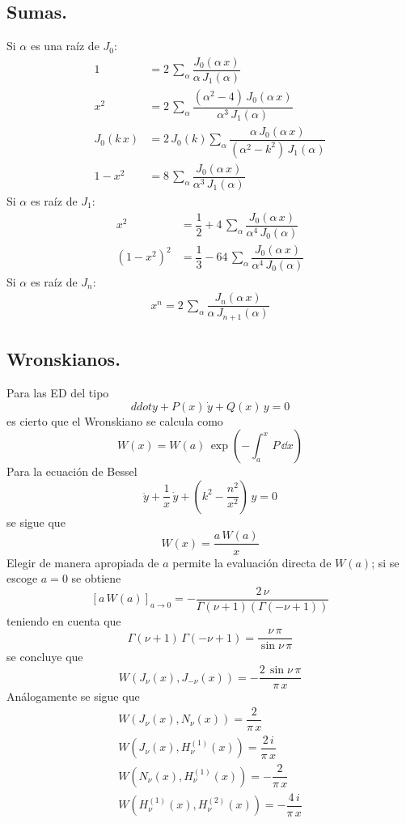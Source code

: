 \subsection{Sumas.}
Si $\alpha$ es una raíz de $J_{0}$:
\begin{align*}
1 &= 2 \, \sum_{\alpha} \dfrac{J_{0} (\alpha \, x)}{\alpha \, J_{1} (\alpha)} \\
x^{2} &= 2 \, \sum_{\alpha} \dfrac{(\alpha^{2}- 4) \, J_{0} (\alpha \, x)}{\alpha^{3} \, J_{1} (\alpha)} \\
J_{0} (k \, x) &= 2 \, J_{0} (k) \sum_{\alpha} \dfrac{\alpha \, J_{0} (\alpha \, x)}{(\alpha^{2} - k^{2}) \, J_{1}(\alpha)} \\
1 -x^{2} &= 8 \, \sum_{\alpha} \dfrac{J_{0}(\alpha \, x)}{\alpha^{3} \, J_{1} (\alpha)}
\end{align*}
Si $\alpha$ es raíz de $J_{1}$:
\begin{align*}
x^{2} &= \dfrac{1}{2} + 4 \, \sum_{\alpha} \dfrac{J_{0} (\alpha \, x)}{\alpha^{4} \, J_{0} (\alpha)} \\
(1 - x^{2})^{2} &= \dfrac{1}{3} - 64 \, \sum_{\alpha} \dfrac{J_{0} (\alpha \, x)}{\alpha^{4} \, J_{0} (\alpha)}
\end{align*}
Si $\alpha$ es raíz de $J_{n}$:
\begin{align*}
x^{n} = 2 \, \sum_{\alpha} \dfrac{J_{n} (\alpha \, x)}{\alpha \, J_{n+1} (\alpha)}
\end{align*}
\subsection{Wronskianos.}
Para las ED del tipo
\[ ddot{y} + P(x) \, \dot{y} + Q(x) \, y = 0 \]
es cierto que el Wronskiano se calcula como
\[ W(x) = W(a) \, \exp(- \int_{a}^{x} \, P \, \dd x) \]
Para la ecuación de Bessel
\[  \ddot{y} + \dfrac{1}{x} \, \dot{y} + (k^{2} - \dfrac{n^{2}}{x^{2}}) \, y = 0 \]
se sigue que
\[ W(x) = \dfrac{a \, W(a)}{x} \]
Elegir de manera apropiada de $a$ permite la evaluación directa de $W(a)$; si se escoge $a=0$ se obtiene
\[ [a \, W(a)]_{a \to 0} =  - \dfrac{2 \, \nu}{\Gamma(\nu + 1)(\Gamma (-\nu +1))} \]
teniendo en cuenta que
\[ \Gamma (\nu + 1) \, \Gamma (-\nu + 1) = \dfrac{\nu \, \pi}{\sin \nu \,\pi } \]
se concluye que
\[ W (J_{\nu} (x), J_{-\nu} (x)) = - \dfrac{2 \, \sin \nu \, \pi}{\pi \, x} \]
Análogamente se sigue que
\begin{align*}
W (J_{\nu} (x), N_{\nu} (x)) = \dfrac{2}{\pi \, x} \\[1em]
W (J_{\nu} (x), H_{\nu}^{(1)} (x)) =  \dfrac{2 \, i}{\pi \, x} \\[1em]
W (N_{\nu} (x), H_{\nu}^{(1)} (x)) = - \dfrac{2}{\pi \, x} \\[1em]
W (H_{\nu}^{(1)} (x), H_{\nu}^{(2)} (x)) = - \dfrac{4 \, i}{\pi \, x}
\end{align*}
